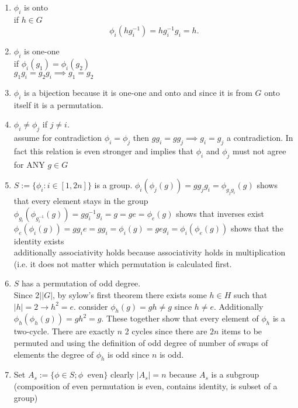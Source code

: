 \documentclass{article}
\begin{document}
    \begin{enumerate}
        \item $\phi_i$ is onto\\
            if $h \in G$ 
            \[
            \phi_i(hg_i^{-1}) = hg_i^{-1}g_i = h
            .\] 
        \item $\phi_i$ is one-one\\
            if $\phi_i(g_1) = \phi_i(g_2)$\\
            $g_1g_i = g_2g_i \implies g_1=g_2$ \\
        \item $\phi_i$ is a bijection because it is one-one and onto
            and since it is from $G$ onto itself it is a permutation.
        \item $\phi_i \ne \phi_j$ if $j \ne i$. \\
            assume for contradiction $\phi_i = \phi_j$ then
            $gg_i = gg_j \implies g_i = g_j$ a contradiction.
            In fact this relation is even stronger and implies that $\phi_i$ and $\phi_j$ must not agree for ANY $g \in G$ 
        \item $S := \{\phi_i : i \in [1,2n]\}$ is a group.
            $\phi_i(\phi_j(g)) = gg_jg_i = \phi_{g_jg_i}(g)$ shows that every element stays in the group\\
            $\phi_{g_i}(\phi_{g_i^{-1}}(g)) = gg_i^{-1}g_i = g = ge = \phi_e(g)$ shows that inverses exist\\ 
            $\phi_e(\phi_i(g)) = gg_ie = gg_i = \phi_i(g) = geg_i = \phi_i(\phi_e(g))$ shows that the identity exists\\
            additionally associativity holds because associativity holds in multiplication (i.e. it does not matter which permutation is calculated first.
        \item  $S$ has a permutation of odd degree.\\
            Since $2 | |G|$, by sylow's first theorem there exists some $h \in H$ such that $|h| = 2 \rightarrow h^2 = e$.
            consider $\phi_h(g) = gh \ne g$ since $h \ne e$.
            Additionally $\phi_h(\phi_h(g)) = gh^2 = g$. These together show that every element of $\phi_h$ is a two-cycle.
            There are exactly $n$ 2 cycles since there are $2n$ items to be permuted and using the definition of odd degree of number of swaps of elements
            the degree of $\phi_h$ is odd since $n$ is odd.
        \item Set $A_s := \{\phi \in S; \phi \; \; \text{even}\}$  clearly $|A_s| = n$ because $A_s$ is a subgroup (composition of even permutation is even, contains identity, is subset of a group)

\end{enumerate}
\end{document}
